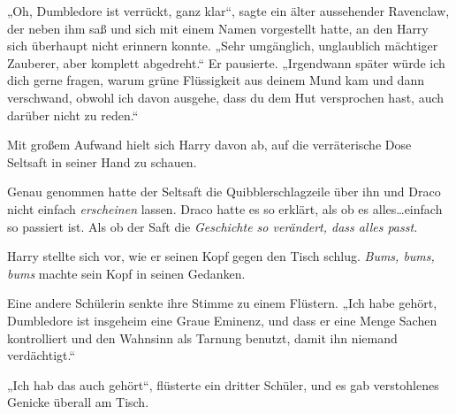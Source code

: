 „Oh, Dumbledore ist verrückt, ganz klar“, sagte ein älter aussehender Ravenclaw, der neben ihm saß und sich mit einem Namen vorgestellt hatte, an den Harry sich überhaupt nicht erinnern konnte. „Sehr umgänglich, unglaublich mächtiger Zauberer, aber komplett abgedreht.“ Er pausierte. „Irgendwann später würde ich dich gerne fragen, warum grüne Flüssigkeit aus deinem Mund kam und dann verschwand, obwohl ich davon ausgehe, dass du dem Hut versprochen hast, auch darüber nicht zu reden.“

Mit großem Aufwand hielt sich Harry davon ab, auf die verräterische Dose Seltsaft in seiner Hand zu schauen.

Genau genommen hatte der Seltsaft die Quibblerschlagzeile über ihn und Draco nicht einfach \emph{erscheinen} lassen. Draco hatte es so erklärt, als ob es alles…einfach so passiert ist. Als ob der Saft die \emph{Geschichte so verändert, dass alles passt.}

Harry stellte sich vor, wie er seinen Kopf gegen den Tisch schlug. \emph{Bums, bums, bums} machte sein Kopf in seinen Gedanken.

Eine andere Schülerin senkte ihre Stimme zu einem Flüstern. „Ich habe gehört, Dumbledore ist insgeheim eine Graue Eminenz, und dass er eine Menge Sachen kontrolliert und den Wahnsinn als Tarnung benutzt, damit ihn niemand verdächtigt.“

„Ich hab das auch gehört“, flüsterte ein dritter Schüler, und es gab verstohlenes Genicke überall am Tisch.

